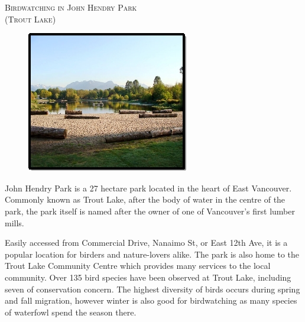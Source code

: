 

\begin{center}
\textsc{\LARGE Birdwatching in John Hendry Park}\\[0.2cm]
\textsc{\Large (Trout Lake)}\\[0.2cm]
\end{center}

\begin{figure}[h]
  \centering
    \includegraphics{tlcover.jpg}
\end{figure}

\large
John Hendry Park is a 27 hectare park located in the heart of East Vancouver. 
Commonly known as Trout Lake, after the body of water in the centre of the park, the 
park itself is named after the owner of one of Vancouver's first lumber mills. 

Easily accessed from Commercial Drive, Nanaimo St, or East 12th Ave, it is a popular location 
for birders and nature-lovers alike. The park is also home to the 
Trout Lake Community Centre which provides many services to the local community. 
Over 135 bird species have been observed at Trout Lake, including seven of conservation concern.
The highest diversity of birds occurs during spring and fall migration, however
winter is also good for birdwatching as many species of waterfowl spend the season there.

